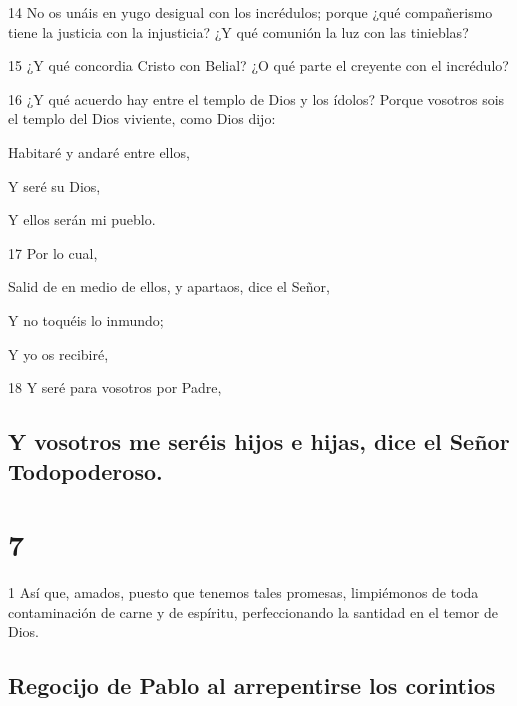 \par 14 No os unáis en yugo desigual con los incrédulos; porque ¿qué compañerismo tiene la justicia con la injusticia? ¿Y qué comunión la luz con las tinieblas?
\par 15 ¿Y qué concordia Cristo con Belial? ¿O qué parte el creyente con el incrédulo?
\par 16 ¿Y qué acuerdo hay entre el templo de Dios y los ídolos? Porque vosotros sois el templo del Dios viviente, como Dios dijo:
\par Habitaré y andaré entre ellos,
\par Y seré su Dios,
\par Y ellos serán mi pueblo.
\par 17 Por lo cual,
\par Salid de en medio de ellos, y apartaos, dice el Señor,
\par Y no toquéis lo inmundo;
\par Y yo os recibiré,
\par 18 Y seré para vosotros por Padre,
\section*{Y vosotros me seréis hijos e hijas, dice el Señor Todopoderoso.}

\chapter{7}

\par 1 Así que, amados, puesto que tenemos tales promesas, limpiémonos de toda contaminación de carne y de espíritu, perfeccionando la santidad en el temor de Dios.

\section*{Regocijo de Pablo al arrepentirse los corintios}

